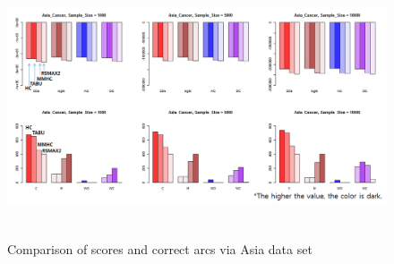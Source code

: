 	\begin{figure}[p]
	\centering
		\includegraphics[height=220pt]{Real_1_Asia}
		\caption{Comparison of scores and correct arcs via Asia data set}
	\end{figure}	